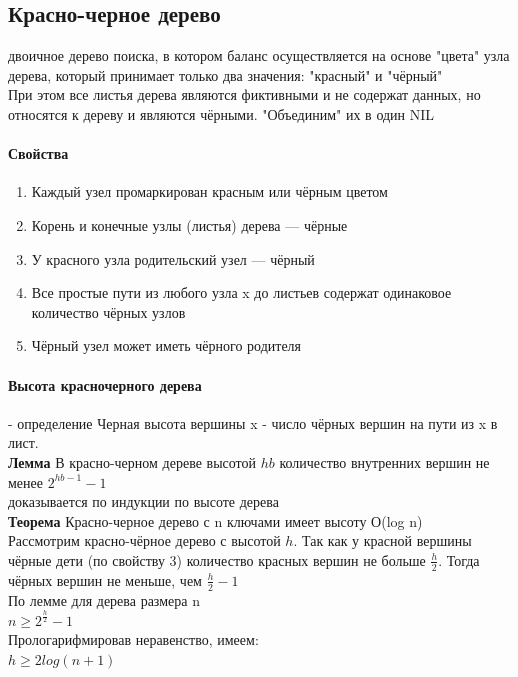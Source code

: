 \documentclass[a4paper,10pt]{article}
\begin{document}
\subsection{Красно-черное дерево}
 двоичное дерево поиска, в котором баланс осуществляется на основе "цвета" узла дерева, который принимает только два значения: "красный" и "чёрный"\\
При этом все листья дерева являются фиктивными и не содержат данных, но относятся к дереву и являются чёрными. "Объединим" их в один NIL\\
\paragraph{Свойства}
\begin{enumerate}
	\item Каждый узел промаркирован красным или чёрным цветом
	\item Корень и конечные узлы (листья) дерева — чёрные
	\item У красного узла родительский узел — чёрный
	\item Все простые пути из любого узла x до листьев содержат одинаковое количество чёрных узлов
	\item Чёрный узел может иметь чёрного родителя
\end{enumerate}
\paragraph{Высота красночерного дерева} - определение
Черная высота вершины x - число чёрных вершин на пути из x в лист.\\
\textbf{Лемма} В красно-черном дереве высотой $hb$ количество внутренних вершин не менее $2^{hb-1}-1$\\
доказывается по индукции по высоте дерева\\
\textbf{Теорема} Красно-черное дерево с n ключами имеет высоту О(log n)\\
Рассмотрим красно-чёрное дерево с высотой $h$. Так как у красной вершины чёрные дети (по свойству 3) количество красных вершин не больше $\frac{h}{2}$. Тогда чёрных вершин не меньше, чем $\frac{h}{2} - 1$\\
По лемме для дерева размера n\\
$n \geq 2^{\frac{h}{2}}-1$\\
Прологарифмировав неравенство, имеем:\\
$h \geq 2log(n+1)$\\
\end{document}
